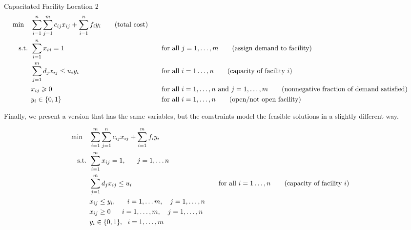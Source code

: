 \begin{general}{Capacitated Facility Location 2}{\npcomplete}
\begin{align}
\min \quad & \displaystyle\sum_{i=1}^n\sum_{j=1}^mc_{ij}x_{ij}+\sum_{i=1}^nf_iy_i   \tag{total cost} \\
\mbox{ s.t. }        & \displaystyle\sum_{i=1}^nx_{ij}=1 &&\quad \mbox{for all } j=1,\dots,m   \tag{assign demand to facility} \\
& \displaystyle \sum_{j=1}^md_jx_{ij}\leq u_iy_i &&\quad \mbox{for all } i=1\dots,n   \tag{capacity of facility $i$} \\
& x_{ij}\geqslant0 &&\quad \mbox{for all } i=1,\dots,n \mbox{ and }j=1,\dots,m   \tag{nonnegative fraction of demand satisfied} \\
& y_i\in\{0,1\} &&\quad \mbox{for all } i=1,\dots,n   \tag{open/not open facility}
\end{align}

\end{general}

Finally, we present a version that has the same variables, but the constraints model the feasible solutions in a slightly different way.

\begin{align*}
\min \quad & \sum_{i = 1}^m\sum_{j=1}^n c_{ij}x_{ij}+\sum_{i = 1}^mf_iy_i \\
\mbox{ s.t. }        & \sum_{i = 1}^mx_{ij} = 1,~~~~~j =1,\ldots n \\
& \displaystyle \sum_{j=1}^md_jx_{ij}\leq u_i &&\quad \mbox{for all } i=1\dots,n   \tag{capacity of facility $i$} \\
& x_{ij}\leq y_i,~~~~~ i = 1,\ldots m,~~~ j = 1,\ldots,n \\
& x_{ij} \geq 0~~~~~ i = 1,\ldots,m, ~~~j = 1,\ldots,n \\
& y_i\in \{0,1\}, \  \  i = 1,\ldots,m
\end{align*}
\fi  %

